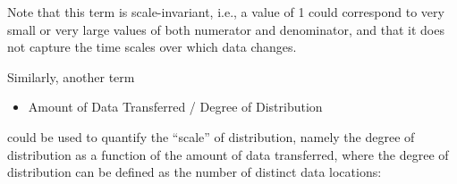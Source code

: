

Note that this term is scale-invariant, i.e., a value of 1 could
correspond to very small or very large values of both numerator and
denominator, and that it does not capture the time scales over
which data changes.




Similarly, another term
\begin{itemize}
\item[] Amount of Data Transferred / Degree of
  Distribution
\end{itemize}
could be used to quantify the
``scale'' of distribution, namely the degree of distribution as a
function of the amount of data transferred, where the degree of
distribution can be defined as the number of distinct data locations:









